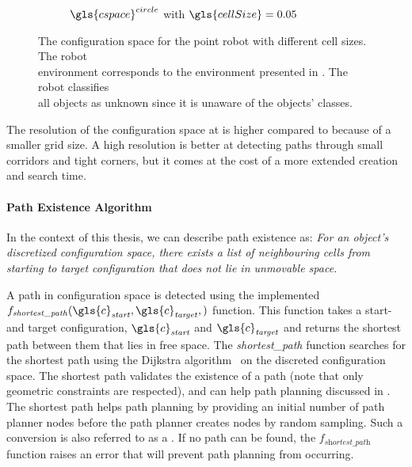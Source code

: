 \begin{figure}[H]
\begin{subfigure}{.49\textwidth}
    \caption{$\gls{cspace}^{circle}$ with $\gls{cellSize} = 0.05$}%
    \label{fig:c_space_two_pushes_smaller}
  \end{subfigure}
  \caption{The configuration space for the point robot with different cell sizes. The robot\\environment corresponds to the environment presented in . The robot classifies\\all objects as unknown since it is unaware of the objects' classes.}
  \label{fig:two_pushes_to_freedom_conf_space}
\end{figure}

The resolution of the configuration space at  is higher compared to  because of a smaller grid size. A high resolution is better at detecting paths through small corridors and tight corners, but it comes at the cost of a more extended creation and search time.

\paragraph{Path Existence Algorithm} In the context of this thesis, we can describe path existence as: \textit{For an object's discretized configuration space, there exists a list of neighbouring cells from starting to target configuration that does not lie in unmovable space.\bs}

A path in configuration space is detected using the implemented\\$f_\mathit{shortest\_path}(\gls{c}_\mathit{start}, \gls{c}_\mathit{target}, )$ function. This function takes a start- and target configuration, $\gls{c}_\mathit{start}$ and $\gls{c}_\mathit{target}$ and returns the shortest path between them that lies in free space. The \textit{shortest\_path} function searches for the shortest path using the Dijkstra algorithm~\cite{dijkstra_note_1959} on the discreted configuration space. The shortest path validates the existence of a path (note that only geometric constraints are respected), and can help path planning discussed in . The shortest path helps path planning by providing an initial number of path planner nodes before the path planner creates nodes by random sampling. Such a conversion is also referred to as a . If no path can be found, the $f_\textit{shortest\_path}$ function raises an error that will prevent path planning from occurring.\bs

